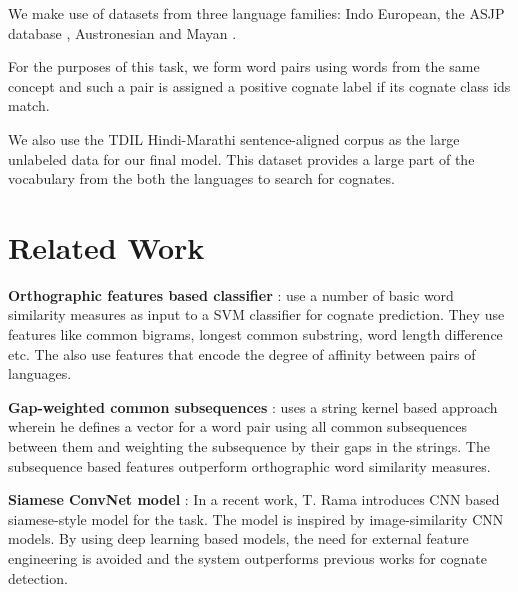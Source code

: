\documentclass[11pt,letterpaper]{article}
\begin{document}
We make use of datasets from three language families: Indo European, the ASJP database \cite{wichmannASJP:2016}, Austronesian \cite{greenhillBlust:08} and Mayan \cite{wichmann:2008}. 




For the purposes of this task, we form word pairs using words from the same concept and such a pair is assigned a positive cognate label if its cognate class ids match.


We also use the TDIL Hindi-Marathi sentence-aligned corpus as the large unlabeled data for our final model. This dataset provides a large part of the vocabulary from the both the languages to search for cognates.

\section{Related Work}
\textbf{Orthographic features based classifier} : \citet{hauer2011clustering} use a number of basic word similarity measures as input to a SVM classifier for cognate prediction. They use features like common bigrams, longest common substring, word length difference etc. The also use features that encode the degree of affinity between pairs of languages.

\textbf{Gap-weighted common subsequences} : \citet{rama2015automatic} uses a string kernel based approach wherein he defines a vector for a word pair using all common subsequences between them and weighting the subsequence by their gaps in the strings. The subsequence based features outperform orthographic word similarity measures.

\textbf{Siamese ConvNet model} : In a recent work, T. Rama introduces CNN based siamese-style model \cite{rama2016siamese} for the task. The model is inspired by image-similarity CNN models. By using deep learning based models, the need for external feature engineering is avoided and the system outperforms previous works for cognate detection.
\end{document}
